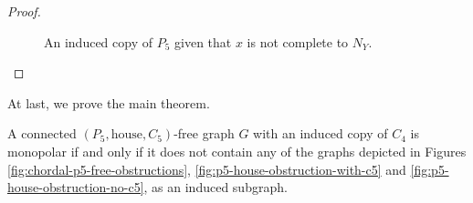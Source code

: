\begin{proof}
\begin{enumerate}[label=(\roman*)]
            \begin{figure}[htb!]
                \centering
                \caption{An induced copy of $P_5$ given that $x$ is not complete
                    to $N_Y$.}
                \label{fig:3_bags_empty_7}
            \end{figure}
    \end{enumerate}
\end{proof}

At last, we prove the main theorem.

\begin{theorem}
    \label{thm:monopolar_c4}
    A connected $(P_5,\text{house},C_5)$-free graph $G$ with an induced copy of
    $C_4$ is monopolar if and only if it does not contain any of the graphs
    depicted in Figures \ref{fig:chordal-p5-free-obstructions},
    \ref{fig:p5-house-obstruction-with-c5} and
    \ref{fig:p5-house-obstruction-no-c5}, as an induced subgraph.
\end{theorem}

